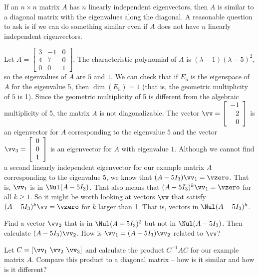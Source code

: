 
If an $n \times n$ matrix $A$ has $n$ linearly independent eigenvectors, then $A$ is similar to a diagonal matrix with the eigenvalues along the diagonal. A reasonable question to ask is if we can do something similar even if $A$ does not have $n$ linearly independent eigenvectors. 

\begin{pa} \label{pa:JCF}  Let $A = \left[ \begin{array}{crc} 3 &-1 & 0  \\ 4 & 7 & 0 \\ 0&0&1 \end{array} \right]$. The characteristic polynomial of $A$ is $(\lambda-1)(\lambda - 5)^2$, so the eigenvalues of $A$ are $5$ and $1$. We can check that if $E_5$ is the eigenspace of $A$ for the eigenvalue 5, then $\dim(E_5) = 1$ (that is, the geometric multiplicity of $5$ is 1). Since the geometric multiplicity of 5 is different from the algebraic multiplicity of 5, the matrix $A$ is not diagonalizable. The vector $\vv = \left[ \begin{array}{r} -1\\2\\0 \end{array}\right]$ is an eigenvector for $A$ corresponding to the eigenvalue $5$ and the vector $\vv_3 = \left[ \begin{array}{c} 0 \\ 0 \\ 1 \end{array}\right]$ is an eigenvector for $A$ with eigenvalue $1$. Although we cannot find a second linearly independent eigenvector for our example matrix $A$ corresponding to the eigenvalue $5$, we know that $(A - 5I_3) \vv_1 = \vzero$. That is, $\vv_1$ is in $\Nul (A - 5I_3)$. That also means that $(A - 5I_3)^k \vv_1 = \vzero$ for all $k \geq 1$. So it might be worth looking at vectors $\vv$ that satisfy $(A-5I_3)^k\vv = \vzero$ for $k$ larger than 1. That is, vectors in $\Nul (A - 5I_3)^k$.  
\ba
\item Find a vector $\vv_2$ that is in $\Nul (A-5I_3)^2$ but not in $\Nul (A-5I_3)$. Then calculate $(A-5I_3)\vv_2$. How is $\vv_1 = (A-5I_3)\vv_2$ related to $\vv$? 

\item  Let $C = [\vv_1 \ \vv_2 \ \vv_3]$ and calculate the product $C^{-1}AC$ for our example matrix $A$. Compare this product to a diagonal matrix -- how is it similar and how is it different?


\end{pa}
